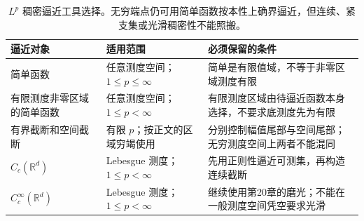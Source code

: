 \begin{table}[htbp]
\centering\small\renewcommand{\arraystretch}{1.18}\setlength{\tabcolsep}{4pt}
\caption[\(L^p\) 稠密逼近工具选择]{\(L^p\) 稠密逼近工具选择。无穷端点仍可用简单函数按本性上确界逼近，但连续、紧支集或光滑稠密性不能照搬。}
\label{b1:tab:visual-t06}
\begin{tabularx}{\linewidth}{@{}>{\raggedright\arraybackslash}p{3.1cm}>{\raggedright\arraybackslash}p{4.7cm}>{\raggedright\arraybackslash}X@{}}
\toprule
逼近对象 & 适用范围 & 必须保留的条件 \\
\midrule
简单函数 & 任意测度空间；\(1\le p\le\infty\) & 简单是有限值域，不等于非零区域测度有限 \\
有限测度非零区域的简单函数 & 任意测度空间；\(1\le p<\infty\) & 有限测度区域由待逼近函数本身选择，不要求底测度先为有限 \\
有界截断和空间截断 & 有限 \(p\)；按正文的区域穷竭使用 & 分别控制幅值尾部与空间尾部；无穷测度空间上两者不能混同 \\
\(C_c(\mathbb R^d)\) & Lebesgue 测度；\(1\le p<\infty\) & 先用正则性逼近可测集，再构造连续截断 \\
\(C_c^\infty(\mathbb R^d)\) & Lebesgue 测度；\(1\le p<\infty\) & 继续使用第20章的磨光；不能在一般测度空间凭空要求光滑 \\
\bottomrule
\end{tabularx}
\end{table}

